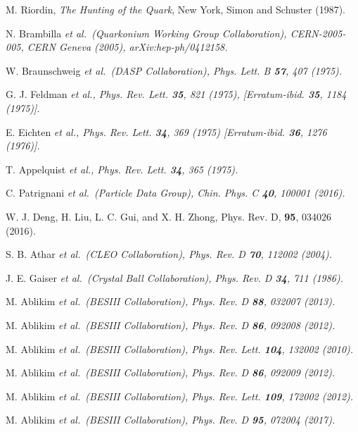 \documentclass[aps,prd,twocolumn,showpacs,floatfix,byrevtex]{revtex4-1}
\newcommand{\etal}{\it et al.\rm}
\begin{document}
\begin{thebibliography}{99}

 M. Riordin, {\it The Hunting of the Quark}, New
  York, Simon and Schuster (1987).

 N. Brambilla \etal ~(Quarkonium Working Group Collaboration), CERN-2005-005, CERN Geneva (2005), arXiv:hep-ph/0412158.

 W. Braunschweig \etal ~(DASP Collaboration), Phys. Lett. B {\bf 57}, 407 (1975).

 G. J. Feldman \etal, Phys. Rev. Lett. {\bf 35}, 821 (1975), [Erratum-ibid. {\bf 35}, 1184 (1975)].

 E. Eichten \etal, Phys. Rev. Lett. {\bf 34}, 369 (1975)
  [Erratum-ibid. {\bf 36}, 1276 (1976)].

 T. Appelquist \etal, Phys. Rev. Lett. {\bf 34}, 365 (1975).

 C. Patrignani \etal ~(Particle Data Group), Chin. Phys. C
  {\bf 40}, 100001 (2016).

 W. J. Deng, H. Liu, L. C. Gui, and X. H. Zhong,
  Phys. Rev. D, {\bf 95}, 034026 (2016).

 S. B. Athar \etal ~(CLEO Collaboration), Phys. Rev. D {\bf 70}, 112002 (2004).

 J. E. Gaiser \etal ~(Crystal Ball Collaboration), Phys. Rev. D {\bf 34}, 711 (1986).



 M. Ablikim \etal ~(BESIII Collaboration), Phys. Rev. D {\bf 88}, 032007 (2013).

 M. Ablikim \etal ~(BESIII Collaboration), Phys. Rev. D {\bf 86}, 092008 (2012).

 M. Ablikim \etal ~(BESIII Collaboration), Phys. Rev. Lett. {\bf 104}, 132002 (2010).

 M. Ablikim \etal ~(BESIII Collaboration), Phys. Rev. D {\bf 86}, 092009 (2012).


 M. Ablikim \etal ~(BESIII Collaboration), Phys. Rev. Lett. {\bf 109}, 172002 (2012).

 M. Ablikim \etal ~(BESIII Collaboration),
  Phys. Rev. D {\bf95}, 072004 (2017).



\end{thebibliography}
\end{document}
